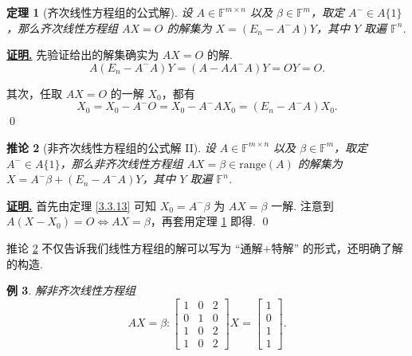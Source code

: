 \documentclass[10pt,openany]{article}
\theoremstyle{thmstyle} %
\newtheorem{theorem}{定理}[subsection]
\theoremstyle{defstyle} %
\newtheorem{corollary}[theorem]{推论}
\theoremstyle{prostyle} %
\theoremstyle{exastyle}
\newtheorem{example}[theorem]{例}
\theoremstyle{remstyle}
\renewenvironment{proof}[1][证明]{\par\underline{\textbf{#1.}} \;\fangsong}{\qed\par}
\newcommand{\F}{\mathbb{F}}
\newcommand{\mn}{^{m \times n}}
\begin{document}
\begin{theorem}[齐次线性方程组的公式解] \label{3.3.14}
	设 \( A \in \F\mn \) 以及 \( \beta \in \F^m \)，取定 \( A^{-} \in A\{1\} \)，那么齐次线性方程组 \( AX=O \) 的解集为 \( X=(E_n-A^{-}A)Y \)，其中 \( Y \) 取遍 \( \F^n \). 
\end{theorem}

\begin{proof}
	先验证给出的解集确实为 \( AX=O \) 的解.
	\[ A(E_n-A^{-}A)Y=(A-AA^{-}A)Y=OY=O. \]
	
	其次，任取 \( AX=O \) 的一解 \( X_0 \)，都有 
	\[ X_0=X_0-A^{-}O=X_0-A^{-}AX_0=(E_n-A^{-}A)X_0. \]
\end{proof}

\begin{corollary}[非齐次线性方程组的公式解 II] \label{3.3.15}
	设 \( A \in \F\mn \) 以及 \( \beta \in \F^m \)，取定 \( A^{-} \in A\{1\} \)，那么非齐次线性方程组 \( AX=\beta \in \text{range}(A) \) 的解集为 \( X=A^{-}\beta+(E_n-A^{-}A)Y \)，其中 \( Y \) 取遍 \( \F^n \). 
\end{corollary}

\begin{proof}
	首先由定理 \ref{3.3.13} 可知 \( X_0=A^{-}\beta \) 为 \( AX=\beta \) 一解. 注意到 \( A(X-X_0)=O \Leftrightarrow AX=\beta \)，再套用定理 \ref{3.3.14} 即得.
\end{proof}

推论 \ref{3.3.15} 不仅告诉我们线性方程组的解可以写为 “通解\(+\)特解” 的形式，还明确了解的构造. 
 
\begin{example}
	解非齐次线性方程组
	\[ AX=\beta: \begin{bmatrix}
		1 & 0 & 2 \\
		0 & 1 & 0 \\
		1 & 0 & 2 \\
		1 & 0 & 2
	\end{bmatrix}X=\begin{bmatrix}
	 1 \\ 0 \\ 1 \\ 1
	\end{bmatrix}. \]
\end{example}
\end{document}
